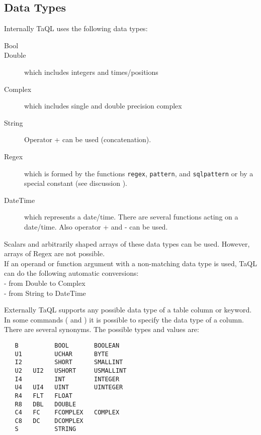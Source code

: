 \subsection{\label{TAQL:DATATYPES}Data Types}
Internally TaQL uses the following data types:
\begin{description}
  \item[Bool ]
  \item[Double ] which includes integers and times/positions
  \item[Complex ] which includes single and double precision complex
  \item[String ] Operator + can be used (concatenation).
  \item[Regex ] which is formed by the functions \texttt{regex},
    \texttt{pattern}, and \texttt{sqlpattern} or by a special constant
    (see discussion ).
  \item[DateTime ] which represents a date/time. There are several functions
       acting on a date/time. Also operator + and - can be used.
\end{description}
Scalars and arbitrarily shaped arrays of these data types can be used.
However, arrays of Regex are not possible.
\\If an operand or function argument with a non-matching data type
is used, TaQL can do the following automatic conversions:
\\- from Double to Complex
\\- from String to DateTime

Externally TaQL supports any possible data type of a table column or
keyword. In some commands ( and
) it is possible to specify
the data type of a column. There are several synonyms.
The possible types and values are:
\begin{verbatim}
   B          BOOL       BOOLEAN
   U1         UCHAR      BYTE
   I2         SHORT      SMALLINT
   U2   UI2   USHORT     USMALLINT
   I4         INT        INTEGER
   U4   UI4   UINT       UINTEGER
   R4   FLT   FLOAT
   R8   DBL   DOUBLE
   C4   FC    FCOMPLEX   COMPLEX
   C8   DC    DCOMPLEX
   S          STRING
\end{verbatim}

